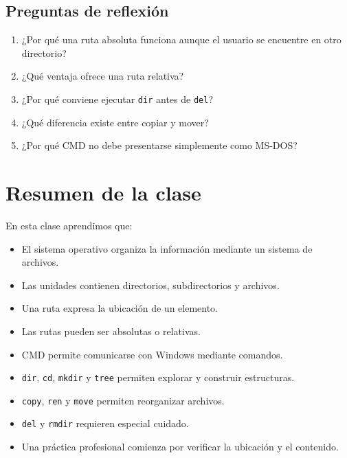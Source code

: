 \documentclass[
  spanish,
  letterpaper,
]{scrbook}
\providecommand{\tightlist}{%
  \setlength{\itemsep}{0pt}\setlength{\parskip}{0pt}}
\begin{document}
\section{Preguntas de reflexión}\label{preguntas-de-reflexiuxf3n}

\begin{enumerate}
\def\labelenumi{\arabic{enumi}.}
\tightlist
\item
  ¿Por qué una ruta absoluta funciona aunque el usuario se encuentre en
  otro directorio?
\item
  ¿Qué ventaja ofrece una ruta relativa?
\item
  ¿Por qué conviene ejecutar \texttt{dir} antes de \texttt{del}?
\item
  ¿Qué diferencia existe entre copiar y mover?
\item
  ¿Por qué CMD no debe presentarse simplemente como MS-DOS?
\end{enumerate}


\chapter{Resumen de la clase}\label{resumen-de-la-clase-1}

En esta clase aprendimos que:

\begin{itemize}
\tightlist
\item
  El sistema operativo organiza la información mediante un sistema de
  archivos.
\item
  Las unidades contienen directorios, subdirectorios y archivos.
\item
  Una ruta expresa la ubicación de un elemento.
\item
  Las rutas pueden ser absolutas o relativas.
\item
  CMD permite comunicarse con Windows mediante comandos.
\item
  \texttt{dir}, \texttt{cd}, \texttt{mkdir} y \texttt{tree} permiten
  explorar y construir estructuras.
\item
  \texttt{copy}, \texttt{ren} y \texttt{move} permiten reorganizar
  archivos.
\item
  \texttt{del} y \texttt{rmdir} requieren especial cuidado.
\item
  Una práctica profesional comienza por verificar la ubicación y el
  contenido.
\end{itemize}
\end{document}
